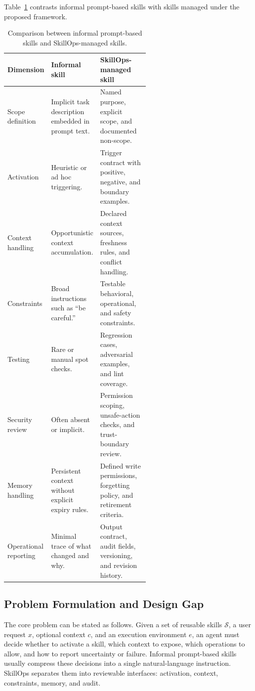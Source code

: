 \documentclass[11pt]{article}
\begin{document}
Table~\ref{tab:informal-vs-skillops} contrasts informal prompt-based skills with
skills managed under the proposed framework.

\begin{table}[t]
\centering
\footnotesize
\begin{tabularx}{\linewidth}{
    >{\raggedright\arraybackslash}p{0.23\linewidth}
    >{\raggedright\arraybackslash}p{0.34\linewidth}
    >{\raggedright\arraybackslash}X
}
\toprule
\textbf{Dimension} & \textbf{Informal skill} & \textbf{SkillOps-managed skill} \\
\midrule
Scope definition & Implicit task description embedded in prompt text. & Named
purpose, explicit scope, and documented non-scope. \\
Activation & Heuristic or ad hoc triggering. & Trigger contract with positive,
negative, and boundary examples. \\
Context handling & Opportunistic context accumulation. & Declared context
sources, freshness rules, and conflict handling. \\
Constraints & Broad instructions such as ``be careful.'' & Testable behavioral,
operational, and safety constraints. \\
Testing & Rare or manual spot checks. & Regression cases, adversarial examples,
and lint coverage. \\
Security review & Often absent or implicit. & Permission scoping, unsafe-action
checks, and trust-boundary review. \\
Memory handling & Persistent context without explicit expiry rules. & Defined
write permissions, forgetting policy, and retirement criteria. \\
Operational reporting & Minimal trace of what changed and why. & Output
contract, audit fields, versioning, and revision history. \\
\bottomrule
\end{tabularx}
\caption{Comparison between informal prompt-based skills and SkillOps-managed
skills.}
\label{tab:informal-vs-skillops}
\end{table}

\subsection{Problem Formulation and Design Gap}

The core problem can be stated as follows. Given a set of reusable skills
\(\mathcal{S}\), a user request \(x\), optional context \(c\), and an execution
environment \(e\), an agent must decide whether to activate a skill, which
context to expose, which operations to allow, and how to report uncertainty or
failure. Informal prompt-based skills usually compress these decisions into a
single natural-language instruction. SkillOps separates them into reviewable
interfaces: activation, context, constraints, memory, and audit.
\end{document}
